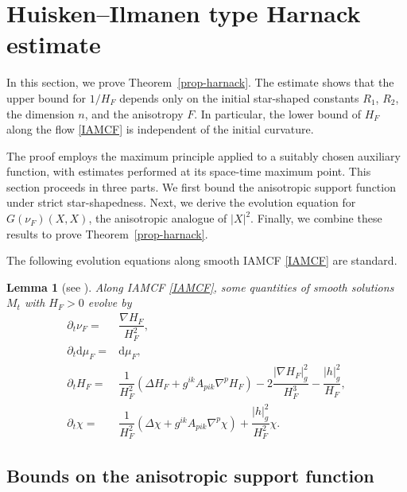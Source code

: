\documentclass[11pt,reqno]{amsart}
\newtheorem{lemma}[proposition]{Lemma}
\theoremstyle{definition}
\theoremstyle{remark}
\numberwithin{equation}{section}
\begin{document}
	

	
	\section{Huisken--Ilmanen type Harnack estimate}
	\label{sec3}
	
	In this section, we prove Theorem~\ref{prop-harnack}. The estimate shows that the upper bound for $1/H_F$ depends only on the initial star-shaped constants $R_1$, $R_2$, the dimension $n$, and the anisotropy $F$. In particular, the lower bound of $H_F$ along the flow \eqref{IAMCF} is independent of the initial curvature.

	The proof employs the maximum principle applied to a suitably chosen auxiliary function, with estimates performed at its space-time maximum point. This section proceeds in three parts. We first bound the anisotropic support function under strict star-shapedness. Next, we derive the evolution equation for $G(\nu_F)(X,X)$, the anisotropic analogue of $|X|^2$. Finally, we combine these results to prove Theorem~\ref{prop-harnack}.

	The following evolution equations along smooth IAMCF \eqref{IAMCF} are standard.
	\begin{lemma}[see {\cite[Proposition 4.1]{Xia17}}]
		Along IAMCF \eqref{IAMCF}, some quantities of smooth solutions $M_t$ with $H_F>0$ evolve by
		\begin{align}		
		\partial_t \nu_F = &\dfrac{\nabla H_F}{H_F^2}, \label{equ-nuf} \\
			\partial_t \mathrm{d}\mu_F =  &\mathrm{d}\mu_F, \label{s2.evl-dmu}\\ 
			\partial_t H_F = &\dfrac{1}{H_F^2}\left( \Delta H_F + g^{ik}A_{pik}\nabla^p H_F \right) - 2 \dfrac{|\nabla H_F|_{g}^2}{H_F^3} - \dfrac{|h|_{g}^2}{H_F},
			\label{equ-amc}\\
			\partial_t \chi = &\dfrac{1}{H_F^2}\left( \Delta\chi + g^{ik}A_{pik}\nabla^p \chi \right) + \dfrac{|h|_{g}^2}{H_F^2}\chi.
			\label{equ-asupp} %
        \end{align}	
\end{lemma}
	
	\subsection{Bounds on the anisotropic support function}
\end{document}
